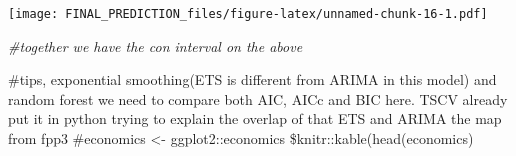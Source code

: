 \documentclass[
]{article}
\newenvironment{Shaded}{\begin{snugshade}}{\end{snugshade}}
\newcommand{\CommentTok}[1]{\textcolor[rgb]{0.56,0.35,0.01}{\textit{#1}}}
\begin{document}
\texttt{[image: FINAL\_PREDICTION\_files/figure-latex/unnamed-chunk-16-1.pdf]}

\begin{Shaded}
\begin{Highlighting}[]
\CommentTok{\#together we have the con interval on the above}
\end{Highlighting}
\end{Shaded}

\#tips, exponential smoothing(ETS is different from ARIMA in this model)
and random forest we need to compare both AIC, AICc and BIC here. TSCV
already put it in python trying to explain the overlap of that ETS and
ARIMA the map from fpp3 \#economics \textless- ggplot2::economics
\$knitr::kable(head(economics)
\end{document}
